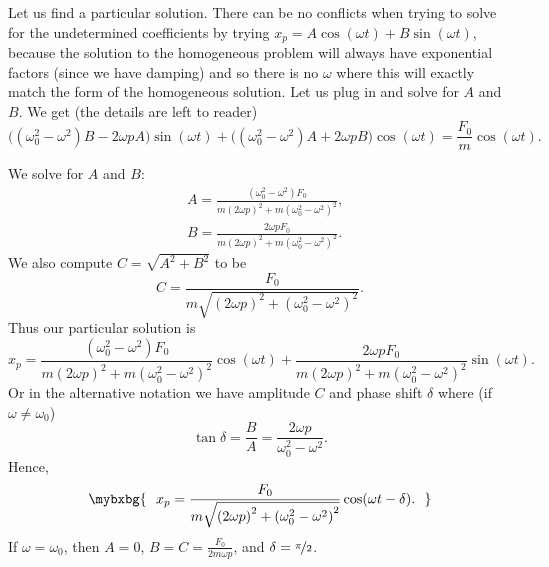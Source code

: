 \pagebreak[2]
Let us find a particular solution.
There can be no conflicts when trying to solve for the
undetermined coefficients by trying $x_p = A \cos (\omega t)
+ B \sin (\omega t)$, because the solution to the homogeneous problem will always have exponential factors (since we have damping) and so there is no $\omega$ where this will exactly match the form of the homogeneous solution.
Let us plug
in and solve for $A$ and $B$.
We get (the  %
details are left to reader)
\begin{equation*}
\bigl((\omega_0^2  - \omega^2)B - 2\omega p A\bigr) \sin (\omega t)
+
\bigl((\omega_0^2  - \omega^2)A + 2\omega p B\bigr) \cos (\omega t)
=
\frac{F_0}{m} \cos (\omega t) .
\end{equation*}

We solve for $A$ and $B$:
\begin{align*}
& A=\frac{(\omega_0^2-\omega^2) F_0}
{m{(2\omega p)}^2+m{(\omega_0^2-\omega^2)}^2} , \\
& B=\frac{2 \omega p F_0}
{m{(2\omega p)}^2+m{(\omega_0^2-\omega^2)}^2} .
\end{align*}
We also compute $C = \sqrt{A^2+B^2}$
to be
\begin{equation*}
C = \frac{F_0}{m \sqrt{{(2\omega p)}^2+{(\omega_0^2-\omega^2)}^2}} .
\end{equation*}
Thus our particular solution is
\begin{equation*}
x_p = 
\frac{(\omega_0^2-\omega^2) F_0}
{m{(2\omega p)}^2+m{(\omega_0^2-\omega^2)}^2} \cos (\omega t) +
\frac{2 \omega p F_0}
{m{(2\omega p)}^2+m{(\omega_0^2-\omega^2)}^2} \sin (\omega t) .
\end{equation*}
Or in the alternative notation we have amplitude $C$ and phase shift $\delta$
where (if $\omega \not= \omega_0$)
\begin{equation*}
\tan \delta = \frac{B}{A} = \frac{2\omega p}{\omega_0^2-\omega^2} .
\end{equation*}
Hence,
\begin{equation*}
\mybxbg{~~
x_p = 
\frac{F_0}{m \sqrt{{(2\omega p)}^2+{(\omega_0^2-\omega^2)}^2}} 
\cos ( \omega t - \delta ) .
~~}
\end{equation*}
If $\omega = \omega_0$, then $A=0$, $B = C = \frac{F_0}{2m\omega p}$,
and $\delta = \nicefrac{\pi}{2}$.


